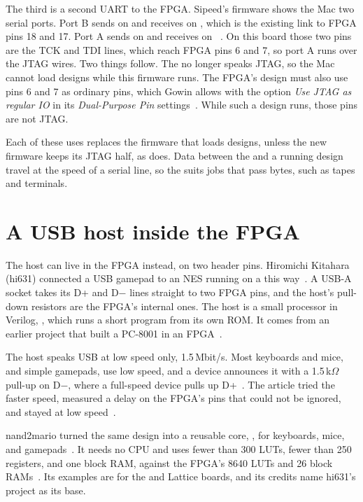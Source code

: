 \documentclass[11pt,a4paper]{article}
\begin{document}
The third is a second UART to the FPGA. Sipeed’s  firmware shows the Mac two serial ports. Port B sends on  and receives on , which is the existing link to FPGA pins 18 and 17. Port A sends on  and receives on ~\cite[]{tn9kfork}. On this board those two pins are the TCK and TDI lines, which reach FPGA pins 6 and 7, so port A runs over the JTAG wires. Two things follow. The  no longer speaks JTAG, so the Mac cannot load designs while this firmware runs. The FPGA’s design must also use pins 6 and 7 as ordinary pins, which Gowin allows with the option \emph{Use JTAG as regular IO} in its \emph{Dual-Purpose Pin} settings~\cite[PDF p.~43]{sug100}. While such a design runs, those pins are not JTAG.

Each of these uses replaces the firmware that loads designs, unless the new firmware keeps its JTAG half, as  does. Data between the  and a running design travel at the speed of a serial line, so the  suits jobs that pass bytes, such as tapes and terminals.

\section*{A USB host inside the FPGA}

The host can live in the FPGA instead, on two header pins. Hiromichi Kitahara (hi631) connected a USB gamepad to an NES running on a  this way~\cite{hi631}. A USB-A socket takes its D+ and D$-$ lines straight to two FPGA pins, and the host’s pull-down resistors are the FPGA’s internal ones. The host is a small processor in Verilog, , which runs a short program from its own ROM. It comes from an earlier project that built a PC-8001 in an FPGA~\cite{hi631}.

The host speaks USB at low speed only, 1.5\,Mbit/s. Most keyboards and mice, and simple gamepads, use low speed, and a device announces it with a 1.5\,k$\Omega$ pull-up on D$-$, where a full-speed device pulls up D+~\cite{nutshell}. The article tried the faster speed, measured a delay on the FPGA’s pins that could not be ignored, and stayed at low speed~\cite{hi631}.

nand2mario turned the same design into a reusable core, , for keyboards, mice, and gamepads~\cite{hidhost}. It needs no CPU and uses fewer than 300 LUTs, fewer than 250 registers, and one block RAM, against the FPGA’s 8640 LUTs and 26 block RAMs~\cite[p.~1]{tnds}. Its examples are for the  and Lattice boards, and its credits name hi631’s  project as its base.
\end{document}
